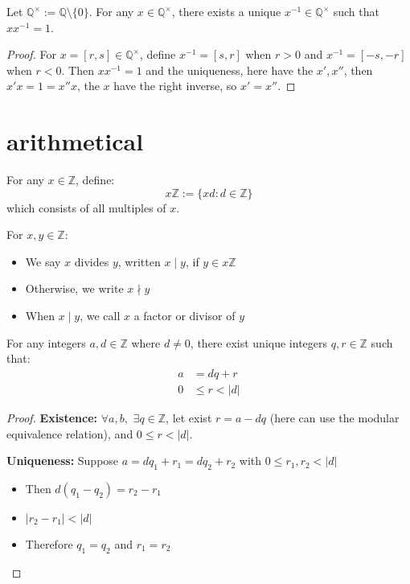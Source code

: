 \begin{proposition}
  Let $\mathbb{Q}^{\times} := \mathbb{Q} \setminus \{0\}$. For any $x \in \mathbb{Q}^{\times}$, there exists a unique $x^{-1} \in \mathbb{Q}^{\times}$ such that $xx^{-1} = 1$.
\end{proposition}

\begin{proof}
  For $x = [r,s] \in \mathbb{Q}^{\times}$, define $x^{-1} = [s,r]$ when $r > 0$ and $x^{-1} = [-s,-r]$ when $r < 0$.
  Then $xx^{-1} = 1$ and the uniqueness, here have the $x',x''$, then $x'x=1=x''x$, the $x$ have the right inverse, so $x'=x''$.
\end{proof}

\section{arithmetical}

\begin{definition}
  For any $x \in \mathbb{Z}$, define:
  \[
    x\mathbb{Z} := \{xd : d \in \mathbb{Z}\}
  \]
  which consists of all multiples of $x$.

  For $x,y \in \mathbb{Z}$:
  \begin{itemize}
    \item We say $x$ divides $y$, written $x\mid y$, if $y \in x\mathbb{Z}$
    \item Otherwise, we write $x \nmid y$
    \item When $x\mid y$, we call $x$ a factor or divisor of $y$
  \end{itemize}
\end{definition}

\begin{proposition}
  For any integers $a,d \in \mathbb{Z}$ where $d \neq 0$, there exist unique integers $q,r \in \mathbb{Z}$ such that:
  \begin{align*}
    a &= dq + r \\
    0 &\leq r < |d|
  \end{align*}
\end{proposition}

\begin{proof}
  \textbf{Existence:}  $\forall a,b,$ $\exists q\in \mathbb{Z}$, let exist $r = a - dq$ (here can use the modular equivalence relation), and $0\leq r<|d|$.

  \textbf{Uniqueness:}
  Suppose $a = dq_1 + r_1 = dq_2 + r_2$ with $0 \leq r_1,r_2 < |d|$
  \begin{itemize}
    \item Then $d(q_1 - q_2) = r_2 - r_1$
    \item $|r_2 - r_1| < |d|$
    \item Therefore $q_1 = q_2$ and $r_1 = r_2$
  \end{itemize}
\end{proof}

